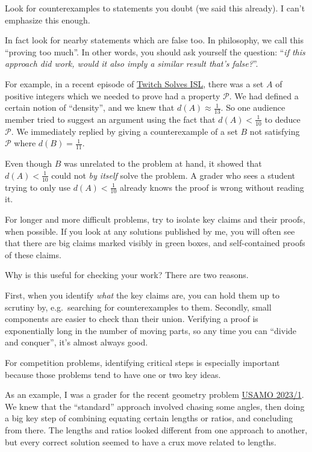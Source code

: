 \documentclass[11pt]{scrartcl}
\begin{document}
\begin{itemize}
  \ii \alert{Look for counterexamples to statements you doubt}
  (we said this already). I can't emphasize this enough.

  \ii In fact \alert{look for nearby statements which are false too}.
  In philosophy, we call this ``proving too much''.
  In other words, you should ask yourself the question:
  ``\emph{if this approach did work,
    would it also imply a similar result that's false?}''.

  For example, in a recent episode of
  \href{https://web.evanchen.cc}{Twitch Solves ISL},
  there was a set $A$ of positive integers
  which we needed to prove had a property $\mathcal{P}$.
  We had defined a certain notion of ``density'',
  and we knew that $d(A) \approx \frac{1}{13}$.
  So one audience member tried to suggest an argument
  using the fact that $d(A) < \frac{1}{10}$ to deduce $\mathcal{P}$.
  We immediately replied by giving a counterexample of a set $B$
  not satisfying $\mathcal{P}$ where $d(B) = \frac{1}{11}$.

  Even though $B$ was unrelated to the problem at hand, it showed that
  $d(A) < \frac{1}{10}$ could not \emph{by itself} solve the problem.
  A grader who sees a student trying to only use $d(A) < \frac{1}{10}$
  already knows the proof is wrong without reading it.

  \ii For longer and more difficult problems,
  try to \alert{isolate key claims and their proofs}, when possible.
  If you look at any solutions published by me,
  you will often see that there are big claims marked visibly in green boxes,
  and self-contained proofs of these claims.

  Why is this useful for checking your work? There are two reasons.
  \begin{itemize}
  \ii First, when you identify \emph{what} the key claims are,
  you can hold them up to scrutiny by, e.g.\
  searching for counterexamples to them.
  \ii Secondly, small components are easier to check than their union.
  Verifying a proof is exponentially long in the number of moving parts,
  so any time you can ``divide and conquer'', it's almost always good.
  \end{itemize}

  \ii For competition problems, \alert{identifying critical steps} is especially
  important because those problems tend to have one or two key ideas.

  As an example, I was a grader for the recent geometry problem
  \href{https://web.evanchen.cc/exams/USAMO-2023-notes.pdf}{USAMO 2023/1}.
  We knew that the ``standard'' approach involved chasing some angles,
  then doing a big key step of combining equating certain lengths or ratios,
  and concluding from there.
  The lengths and ratios looked different from one approach to another,
  but every correct solution seemed to have a crux move related to lengths.


\end{itemize}
\end{document}
